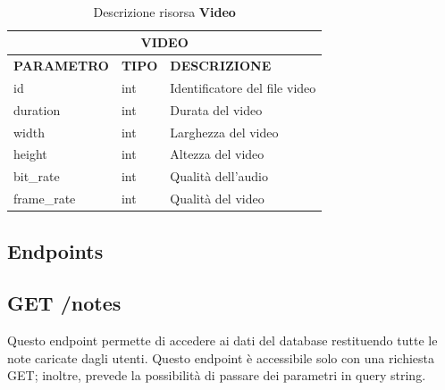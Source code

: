 \ \linebreak
\begin{table}[!h]
\centering
	\begin{tabular}{@{}lll@{}}
		\toprule
		\multicolumn{3}{c}{\textbf{VIDEO}}                                 \\ \midrule
		\textbf{PARAMETRO} & \textbf{TIPO} & \textbf{DESCRIZIONE}          \\
		id                 & int           & Identificatore del file video \\
		duration           & int           & Durata del video              \\
		width              & int           & Larghezza del video           \\
		height             & int           & Altezza del video             \\
		bit\_rate          & int           & Qualità dell'audio            \\
		frame\_rate        & int           & Qualità del video             \\ \bottomrule
	\end{tabular}
\caption{Descrizione risorsa \textbf{Video}}\label{tab:videoModel}
\end{table}


\pagebreak
\subsection{Endpoints}

\subsection{GET /notes}
\label{sec:APIDocGetNotes}
Questo endpoint permette di accedere ai dati del database restituendo tutte le note caricate dagli utenti. 
Questo endpoint è accessibile solo con una richiesta GET; inoltre, prevede la possibilità di passare dei parametri in query string.


